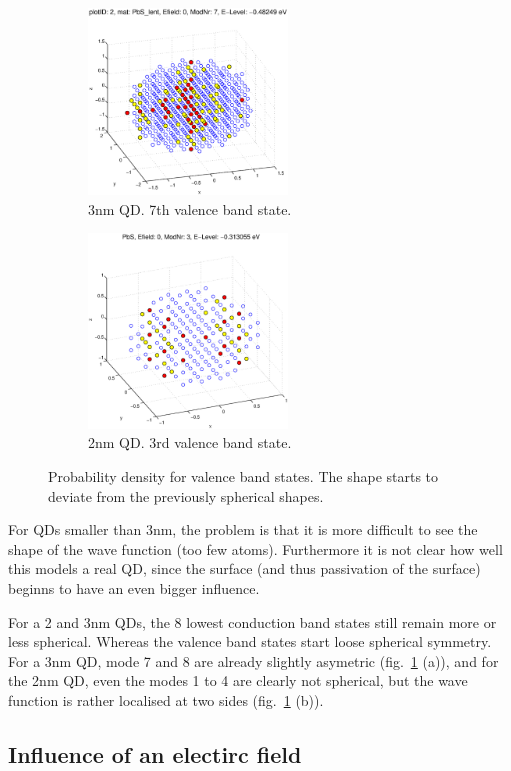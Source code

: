 \begin{figure}
	\centering
	\begin{subfigure}{200px}
		\includegraphics[width=200px]{Fig/Plots/r15VBmod7}
		\caption{3nm QD. 7th valence band state.}
	\end{subfigure}
	\begin{subfigure}{200px}
		\includegraphics[width=200px]{Fig/Plots/r1VBmod3}
		\caption{2nm QD. 3rd valence band state.}
	\end{subfigure}
	\caption{Probability density for valence band states. The shape starts to deviate from the previously spherical shapes.}
	\label{fig:asymWaveFn}
\end{figure}


For QDs smaller than 3nm, the problem is that it is more difficult to see the shape of the wave function (too few atoms). Furthermore it is not clear how well this models a real QD, since the surface (and thus passivation of the surface) beginns to have an even bigger influence.
	
For a 2 and 3nm QDs, the 8 lowest conduction band states still remain more or less spherical. Whereas the valence band states start loose spherical symmetry. For a 3nm QD, mode 7 and 8 are already slightly asymetric (fig.~\ref{fig:asymWaveFn} (a)), and for the 2nm QD, even the modes 1 to 4 are clearly not spherical, but the wave function is rather localised at two sides (fig.~\ref{fig:asymWaveFn} (b)).
	
\FloatBarrier
\subsection{Influence of an electirc field}

